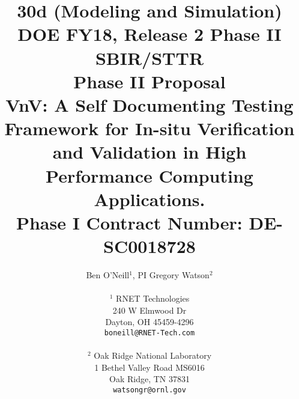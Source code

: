 \title{30d (Modeling and Simulation)\\
DOE FY18, Release 2 Phase II SBIR/STTR \\
\vspace{0.25in}Phase II Proposal\\
\vspace{0.25in} VnV: A Self Documenting Testing Framework for In-situ Verification and Validation in High Performance Computing Applications.\\
Phase I Contract Number: DE-SC0018728\\
\vspace{0.15in}}
\author{Ben O'Neill$^1$, PI \hspace{0.75in} Gregory Watson$^2$\\
  \\$^1$ RNET Technologies\\
  240 W Elmwood Dr\\
  Dayton, OH 45459-4296\\
  {\tt boneill@RNET-Tech.com}\\\\
  $^2$ Oak Ridge National Laboratory\\
  1 Bethel Valley Road MS6016\\
  Oak Ridge, TN 37831\\
  {\tt watsongr@ornl.gov}
}


